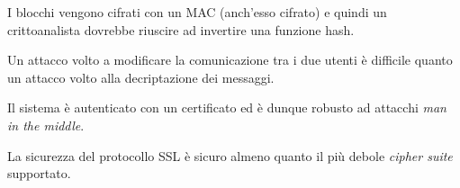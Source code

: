 I blocchi vengono cifrati con un MAC (anch'esso cifrato) e quindi un crittoanalista dovrebbe riuscire ad invertire
una funzione hash.

Un attacco volto a modificare la comunicazione tra i due utenti \`e difficile quanto un attacco volto alla decriptazione
dei messaggi.

Il sistema \`e autenticato con un certificato ed \`e dunque robusto ad attacchi \emph{man in the middle}.

La sicurezza del protocollo SSL \`e sicuro almeno quanto il pi\`u debole \emph{cipher suite} supportato.